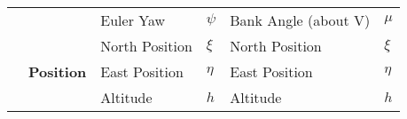 \documentclass[12pt]{ucthesis}
\begin{document}
\begin{tabular}{c c || m{1.75in} |>{\centering\arraybackslash}m{.25in}||m{1.75in}|>{\centering\arraybackslash}m{.25in}|}
\multicolumn{1}{c}{} & \multicolumn{1}{c}{} & Euler Yaw            & $\psi$               & Bank Angle (about V) & $\mu$ \\[.1in]
\cmidrule(r){3-6}
\multicolumn{1}{c}{} & \multicolumn{1}{c}{\multirow{3}[2]{*}{\begin{sideways}\textbf{Position}\end{sideways}}} & North Position       & $\xi$                & North Position       & $\xi$ \\[.1in]
\multicolumn{1}{c}{} & \multicolumn{1}{c}{} & East Position        & $\eta$               & East Position        & $\eta$ \\[.1in]
\multicolumn{1}{c}{} & \multicolumn{1}{c}{} & Altitude             & $h$                  & Altitude             & $h$ \\[.1in]

\bottomrule
\end{tabular}
\end{document}
